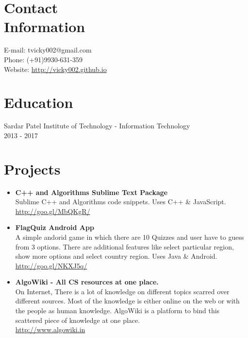 \documentclass[margin,line]{res}
\begin{document}

\begin{resume}

\section{Contact\\Information}  
E-mail: tvicky002@gmail.com\\
Phone: (+91)9930-631-359\\
Website: \url{http://vicky002.github.io}\\



\section{Education}
Sardar Patel Institute of Technology - Information Technology\\
2013 - 2017\\

\section{Projects}
\begin{itemize} \itemsep -4pt
\item \textbf{C++ and Algorithms Sublime Text Package }\\
Sublime C++ and Algorithms code snippets. Uses C++ \& JavaScript. \\
\url{http://goo.gl/MbQKgR/}\\

\item \textbf{FlagQuiz Android App}\\
A simple andorid game in which there are 10 Quizzes and user have to guess from 3 options. There are additional features like select particular region, show more options and select country region. Uses Java \& Android.\\
 \url{http://goo.gl/NKXJ5q/}\\

\item \textbf{AlgoWiki - All CS resources at one place.}\\
On Internet, There is a lot of knowledge on different topics scarred over different sources. Most of the knowledge is
either online on the web or with the people as human knowledge. AlgoWiki is a platform to bind this scattered piece of knowledge at one place. \\
\url{http://www.algowiki.in}\\


\end{itemize}
\end{resume}
\end{document}
